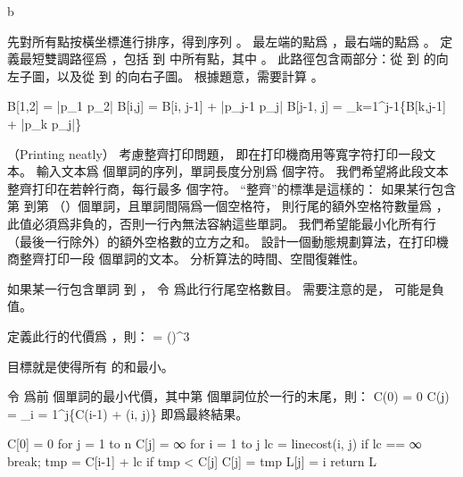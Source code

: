 \startANSWER
{}
{\externalfigure[output/p15_3-2][width=.3\textwidth]}{b}
\stopcombination

先對所有點按橫坐標進行排序，得到序列 。
最左端的點爲 ，最右端的點爲 。
定義最短雙調路徑爲 ，包括  到  中所有點，其中 。
此路徑包含兩部分：從  到  的向左子圖，以及從  到  的向右子圖。
根據題意，需要計算 。

\startformula\startmathalignment
\NC B[1,2] \NC = |p_1 p_2| \NR
\NC B[i,j] \NC = B[i, j-1] + |p_{j-1} p_j| \qquad {} \NR
\NC B[j-1, j] \NC = \min_{k=1}^{j-1}\{B[k,j-1] + |p_k p_j|\} \NR
\stopmathalignment\stopformula
\stopANSWER

\startPROBLEM
（Printing neatly）
考慮整齊打印問題，
即在打印機商用等寬字符打印一段文本。
輸入文本爲  個單詞的序列，單詞長度分別爲  個字符。
我們希望將此段文本整齊打印在若幹行商，每行最多  個字符。
“整齊”的標準是這樣的：
如果某行包含第  到第  （）個單詞，且單詞間隔爲一個空格符，
則行尾的額外空格符數量爲 ，
此值必須爲非負的，否則一行內無法容納這些單詞。
我們希望能最小化所有行（最後一行除外）的額外空格數的立方之和。
設計一個動態規劃算法，在打印機商整齊打印一段  個單詞的文本。
分析算法的時間、空間復雜性。
\stopPROBLEM

\startANSWER
如果某一行包含單詞  到 ，
令  爲此行行尾空格數目。
需要注意的是， \m{\EXTRAS} 可能是負值。

定義此行的代價爲 \m{\LINECOST[i,j]}，則：
\startformula
\LINECOST[i,j] = \startcases
\NC \infty \MC {}\NR
{} \MC {} \NR
\NC (\EXTRAS[i,j])^3 \MC {} \NR
\stopcases
\stopformula

目標就是使得所有 \m{\LINECOST} 的和最小。

令  爲前  個單詞的最小代價，其中第  個單詞位於一行的末尾，則：
\startformula\startmathalignment
\NC C(0) \NC = 0 \NR
\NC C(j) \NC = \min_{i = 1}^{j}\{C(i-1) + \LINECOST(i, j)\} \NR
\stopmathalignment\stopformula
{} 即爲最終結果。

\startCLRS
C[0] = 0
for j = 1 to n
	C[j] = ∞
	for i = 1 to j
		lc = linecost(i, j)
		if lc == ∞
			break;
		tmp = C[i-1] + lc
		if tmp < C[j]
			C[j] = tmp
			L[j] = i
return L
\stopCLRS

